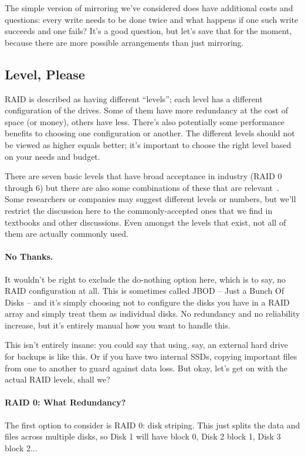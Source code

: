 The simple version of mirroring we've considered does have additional costs and questions: every write needs to be done twice and what happens if one such write succeeds and one fails? It's a good question, but let's save that for the moment, because there are more possible arrangements than just mirroring.

\subsection*{Level, Please}

RAID is described as having different ``levels''; each level has a different configuration of the drives. Some of them have more redundancy at the cost of space (or money), others have less. There's also potentially some performance benefits to choosing one configuration or another. The different levels should not be viewed as higher equals better; it's important to choose the right level based on your needs and budget. 

There are seven basic levels that have broad acceptance in industry (RAID 0 through 6) but there are also some combinations of these that are relevant~\cite{osi}. Some researchers or companies may suggest different levels or numbers, but we'll restrict the discussion here to the commonly-accepted ones that we find in textbooks and other discussions. Even amongst the levels that exist, not all of them are actually commonly used. 

\paragraph{No Thanks.} It wouldn't be right to exclude the do-nothing option here, which is to say, no RAID configuration at all. This is sometimes called JBOD -- Just a Bunch Of Disks -- and it's simply choosing not to configure the disks you have in a RAID array and simply treat them as individual disks. No redundancy and no reliability increase, but it's entirely manual how you want to handle this.

This isn't entirely insane: you could say that using, say, an external hard drive for backups is like this. Or if you have two internal SSDs, copying important files from one to another to guard against data loss. But okay, let's get on with the actual RAID levels, shall we?

\paragraph{RAID 0: What Redundancy?}
The first option to consider is RAID 0: disk striping. This just splits the data and files across multiple disks, so Disk 1 will have block 0, Disk 2 block 1, Disk 3 block 2... 

